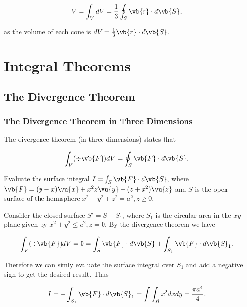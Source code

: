 \documentclass[english,a4paper,12pt]{report}
\begin{document}
\begin{equation}
	V = \int_{V}^{} dV = \frac{1}{3} \oint_{S} \vb{r} \cdot d\vb{S}, 
\end{equation}

as the volume of each cone is \(dV = \frac{1}{3} \vb{r} \cdot d\vb{S}  \). 


\section{Integral Theorems}

\subsection{The Divergence Theorem}

\subsubsection{The Divergence Theorem in Three Dimensions}
The divergence theorem (in three dimensions) states that 

\begin{equation} \label{divthmm} 
	\int _{V}(\div{\vb{F} } )dV = \oint_{S} \vb{F} \cdot d\vb{S} .
\end{equation}

{Evaluate the surface integral \(I = \int_{S}^{} \vb{F} \cdot d\vb{S}  \), where \(\vb{F} = (y-x)\vu{x} + x^2z \vu{y} + (z+x^2) \vu{z}\) and \(S\) is the open surface of the hemisphere \(x^2 + y^2 + z^2 = a^2, z \ge 0\).}
{Consider the closed surface \(S' = S + S_1 \), where \(S_1 \) is the circular area in the \(xy\)-plane given by \(x^2 + y^2 \le a^2, z=0\). By the divergence theorem we have

\begin{equation}
	\int_{V}^{} (\div{\vb{F} } )dV = 0 = \int_{S}^{} \vb{F} \cdot d\vb{S} + \int_{S_1 }^{} \vb{F} \cdot d\vb{S}_{1} .  
\end{equation}

Therefore we can simly evaluate the surface integral over \(S_1 \) and add a negative sign to get the desired result. Thus

\begin{equation}
	I = - \int_{S_1 }^{} \vb{F} \cdot d\vb{S} _{1} = \int \int_{R}^{} x^2dxdy = \frac{\pi a^4}{4}.   
\end{equation}
} 
\end{document}
